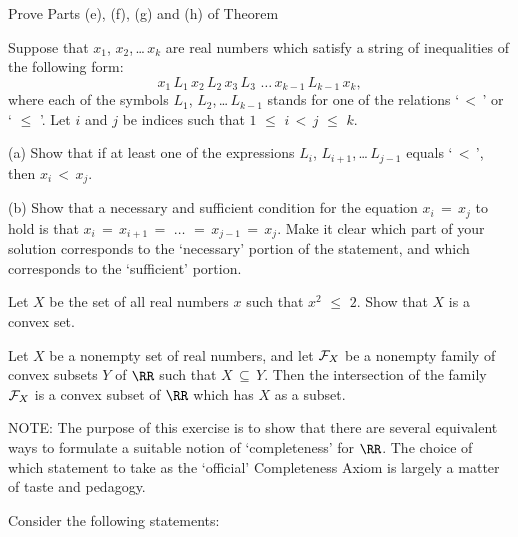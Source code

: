 \V
\V

\noindent \ExBy Prove Parts (e), (f), (g) and (h) of Theorem~  %


\V
\V

\noindent \ExBz \label{ExBz} Suppose that $x_{1}$, $x_{2}$,\,{\ldots}\,$x_{k}$ are real numbers which satisfy a string of inequalities of the following form:
        \begin{displaymath}
        x_{1} \,L_{1}\,x_{2} \,L_{2}\,x_{3} \,L_{3}\,\,{\ldots}\,x_{k-1} \,L_{k-1}\,x_{k},
        \end{displaymath}
    where each of the symbols $L_{1}$, $L_{2}$,\,{\ldots}\,$L_{k-1}$ stands for one of the relations `$\,<\,$' or `$\,\,{\leq}\,\,$'.
    Let $i$ and $j$ be indices such that $1\,\,{\leq}\,\,i\,<\,j\,\,{\leq}\,\,k$.

\V

        (a) Show that if at least one of the expressions $L_{i}$, $L_{i+1}$,\,{\ldots}\,$L_{j-1}$ equals `$\,<\,$', then $x_{i}\,<\,x_{j}$.

\V

        (b) Show that a necessary and sufficient condition for the equation $x_{i} \,=\, x_{j}$ to hold is that $x_{i} \,=\, x_{i+1} \,=\, \,{\ldots}\, \,=\, x_{j-1} \,=\, x_{j}$.
    Make it clear which part of your solution corresponds to the `necessary' portion of the statement, and which corresponds to the `sufficient' portion.

\V
\V

\noindent \ExBaa Let $X$ be the set of all real numbers $x$ such that $x^{2}\,\,{\leq}\,\,2$.
    Show that $X$ is a convex set.

\V
\V

\noindent \ExBab Let $X$ be a nonempty set of real numbers, and let ${\cal F}_{X}$ be a nonempty family of convex subsets $Y$ of ${\RR}$ such that $X \,{\subseteq}\, Y$.
    Then the intersection of the family ${\cal F}_{X}$ is a convex subset of ${\RR}$ which has $X$ as a subset.

\V
\V

\noindent \ExBac NOTE: The purpose of this exercise is to show that there are several equivalent ways to formulate a suitable notion of `completeness' for ${\RR}$.
    The choice of which statement to take as the `official' Completeness Axiom is largely a matter of taste and pedagogy.

\V

        Consider the following statements:


